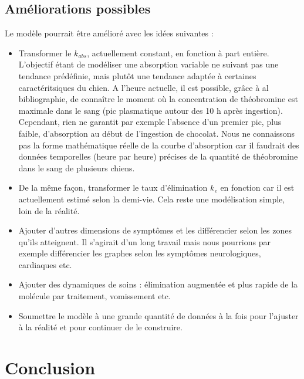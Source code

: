 \documentclass[11pt,a4paper]{article}
\begin{document}
\subsection{Améliorations possibles}

Le modèle pourrait être amélioré avec les idées suivantes :

\begin{itemize}
    \item Transformer le $k_{abs}$, actuellement constant, en fonction à part entière. L'objectif 
    étant de modéliser une absorption variable ne suivant pas une tendance prédéfinie, mais 
    plutôt une tendance adaptée à certaines caractéritsiques du chien. 
    A l'heure actuelle, il est possible, grâce à al bibliographie, de connaître le moment 
    où la concentration de théobromine est maximale dans le sang (pic plasmatique autour des 
    10 h après ingestion). Cependant, rien ne garantit par exemple l'absence d'un premier pic, 
    plus faible, d'absorption au début de l'ingestion de chocolat. Nous ne connaissons 
    pas la forme mathématique réelle de la courbe d'absorption car il faudrait des données 
    temporelles (heure par heure) précises de la quantité de théobromine dans le sang de 
    plusieurs chiens.
    \item De la même façon, transformer le taux d'élimination $k_e$ en fonction car il est 
    actuellement estimé selon la demi-vie. Cela reste une modélisation simple, loin de la 
    réalité.
    \item Ajouter d'autres dimensions de symptômes et les différencier selon les zones 
    qu'ils atteignent. Il s'agirait d'un long travail mais nous pourrions par exemple 
    différencier les graphes selon les symptômes neurologiques, cardiaques etc.
    \item Ajouter des dynamiques de soins : élimination augmentée et plus rapide de la 
    molécule par traitement, vomissement etc.
    \item Soumettre le modèle à une grande quantité de données à la fois pour l'ajuster 
    à la réalité et pour continuer de le construire. 
\end{itemize}

\section{Conclusion}
\label{sec:conclusion}
\end{document}
